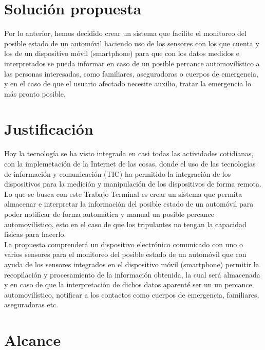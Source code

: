 \section{Solución propuesta}

Por lo anterior, hemos decidido crear un sistema que facilite el monitoreo del posible estado de un automóvil haciendo uso de los sensores con los que cuenta y los de un dispositivo móvil (smartphone) para que con los datos medidos e interpretados se pueda informar en caso de un posible percance automovilístico a las personas interesadas, como familiares, aseguradoras o cuerpos de emergencia, y en el caso de que el usuario afectado necesite auxilio, tratar la emergencia lo más pronto posible.



\section{Justificación}
Hoy la tecnología se ha visto integrada en casi todas las actividades cotidianas, con la implemetación de la Internet de las cosas, donde el uso de las tecnologías de información y comunicación (TIC) ha permitido la integración de los dispositivos para la medición y manipulación de los dispositivos de forma remota.\\



Lo que se busca con este Trabajo Terminal es crear un sistema que permita almacenar e interpretar la información del posible estado de un automóvil para poder notificar de forma automática y manual un posible percance automovilístico, esto en el caso de que los tripulantes no tengan la capacidad físicas para hacerlo.\\


La propuesta comprenderá un dispositivo electrónico comunicado con uno o varios sensores para el monitoreo del posible estado de un automóvil que con ayuda de los sensores integrados en el dispositivo móvil (smartphone) permitir la recopilación y procesamiento de la información obtenida, la cual será almacenada y en caso de que la interpretación de dichos datos aparenté ser un un percance automovilístico, notificar a los contactos como cuerpos de emergencia, familiares, aseguradoras etc.



\section{Alcance}

